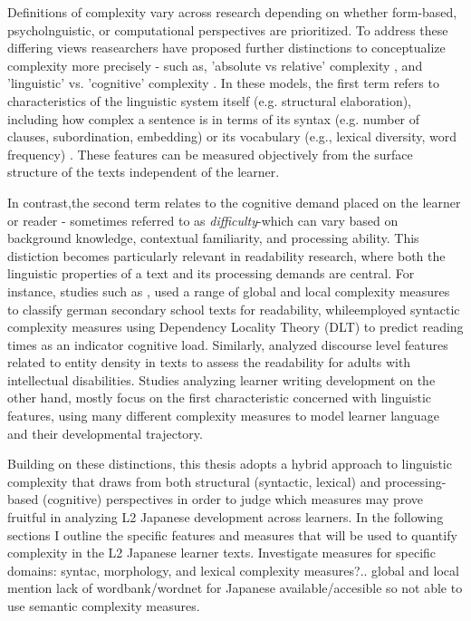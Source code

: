 Definitions of complexity vary across research depending on whether form-based, psycholnguistic, or computational
perspectives are prioritized. To address these differing views reasearchers have proposed further distinctions
to conceptualize complexity more precisely - such as, 'absolute vs relative' complexity
\citet{Miestamo2008, Butle2012}, and
'linguistic' vs. 'cognitive' complexity \cite{housen2009}. In these models, the first term refers to characteristics
of the linguistic system itself (e.g. structural elaboration), including how complex a sentence is in terms of its
syntax (e.g. number of clauses, subordination, embedding) or its vocabulary (e.g., lexical diversity, word frequency)
. These features can be measured objectively from the surface structure of the texts independent of the learner.


In contrast,the second term relates to the cognitive demand placed on the learner or reader - sometimes referred to
as \emph{difficulty}\cite{Pallotti2015}-which can vary based on background knowledge, contextual familiarity, and processing ability.
This distiction becomes particularly relevant in readability research, where both the linguistic properties of a text and its processing demands are central. For instance, studies such as \citet{Berendes2018}, used a range of global and local complexity measures to classify german secondary school texts for readability, while\citet{shain2016}employed syntactic complexity measures using Dependency Locality Theory (DLT) to predict reading times as an indicator cognitive load. Similarly, \citet{Feng2009} analyzed discourse level features related to entity density in texts to assess the readability for adults with intellectual disabilities. Studies analyzing learner writing development on the other hand, mostly focus on the first characteristic concerned with linguistic features, using many different complexity measures to model learner language and their developmental trajectory\cite{Lu2010,Lu2011,Vyatkina2012,weiss2019,Iwashita2006,Wolfe1998, Ortega2003,NorrisOrtega2009}.

Building on these distinctions, this thesis adopts a hybrid approach to linguistic complexity that draws from both
structural (syntactic, lexical) and processing-based (cognitive) perspectives in order to judge which measures may
prove fruitful in analyzing L2 Japanese development across learners. In
the following
sections I outline
the specific features and measures that will be used to quantify complexity in the L2 Japanese learner texts.
Investigate measures for specific domains: syntac, morphology, and lexical complexity measures?.. global and local
mention lack of wordbank/wordnet for Japanese available/accesible so not able to use semantic complexity measures.

